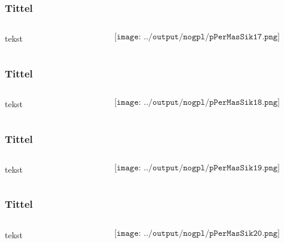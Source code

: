 \documentclass[aspectratio=169,xcolor=dvipsnames]{beamer}
\begin{document}
\begin{frame}
	\frametitle{Tittel}
	\begin{columns}
		\begin{column}{0.5\textwidth}
tekst
			
		\end{column}

		\begin{column}{0.5\textwidth}
	$$\texttt{[image: ../output/nogpl/pPerMasSik17.png]}$$
		\end{column}
	\end{columns}
\end{frame}

\begin{frame}
	\frametitle{Tittel}
	\begin{columns}
		\begin{column}{0.5\textwidth}
tekst
			
		\end{column}

		\begin{column}{0.5\textwidth}
	$$\texttt{[image: ../output/nogpl/pPerMasSik18.png]}$$
		\end{column}
	\end{columns}
\end{frame}

\begin{frame}
	\frametitle{Tittel}
	\begin{columns}
		\begin{column}{0.5\textwidth}
tekst
			
		\end{column}

		\begin{column}{0.5\textwidth}
	$$\texttt{[image: ../output/nogpl/pPerMasSik19.png]}$$
		\end{column}
	\end{columns}
\end{frame}

\begin{frame}
	\frametitle{Tittel}
	\begin{columns}
		\begin{column}{0.5\textwidth}
tekst
			
		\end{column}

		\begin{column}{0.5\textwidth}
	$$\texttt{[image: ../output/nogpl/pPerMasSik20.png]}$$
		\end{column}
	\end{columns}
\end{frame}
\end{document}
